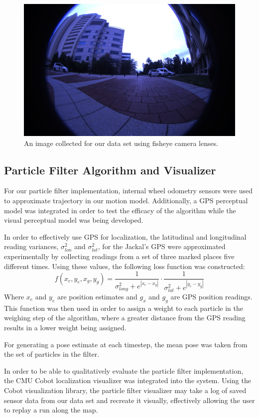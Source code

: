 \documentclass[letterpaper, 12 pt, conference]{ieeeconf}  %
\begin{document}
\begin{figure}[h]
\centering
\includegraphics[scale=0.21]{Fisheye}
\caption{An image collected for our data set using fisheye camera lenses.}
\end{figure}

\subsection{Particle Filter Algorithm and Visualizer}
For our particle filter implementation, internal wheel odometry sensors were used to approximate trajectory in our motion model. Additionally, a GPS perceptual model was integrated in order to test the efficacy of the algorithm while the visual perceptual model was being developed. 
\par
In order to effectively use GPS for localization, the latitudinal and longitudinal reading variances, $\sigma _{lon}^2$ and $\sigma _{lat}^2$, for the Jackal's GPS were approximated experimentally by collecting readings from a set of three marked places five different times. Using these values, the following loss function was constructed:
$$
f(x_e,y_e,x_g,y_g)= \frac{1}{\sigma _{long}^2 + e^{|x_e-x_g|}}\cdot \frac{1}{\sigma _{lat}^2 + e^{|y_e-y_g|}}
$$
Where $x_e$ and $y_e$ are position estimates and $g_x$ and $g_y$ are GPS position readings. This function was then used in order to assign a weight to each particle in the weighing step of the algorithm, where a greater distance from the GPS reading results in a lower weight being assigned.
\par
For generating a pose estimate at each timestep, the mean pose was taken from the set of particles in the filter. 
\par
In order to be able to qualitatively evaluate the particle filter implementation, the CMU Cobot \cite{cobot} localization visualizer was integrated into the system. Using the Cobot visualization library, the particle filter visualizer may take a log of saved sensor data from our data set and recreate it visually, effectively allowing the user to replay a run along the map. 
\end{document}
